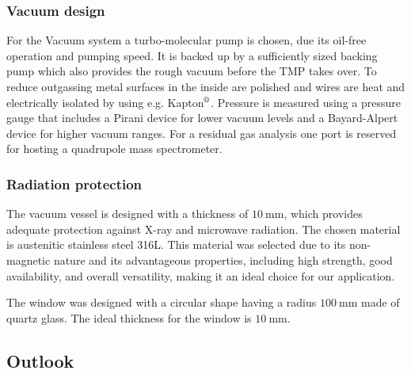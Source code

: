 \subsubsection{Vacuum design}


For the Vacuum system a turbo-molecular pump is chosen, due its oil-free operation and pumping speed.
It is backed up by a sufficiently sized backing pump which also provides the rough vacuum before the TMP takes over.
To reduce outgassing metal surfaces in the inside are polished and wires are heat and electrically isolated by using e.g. Kapton$\textsuperscript{\textregistered}$.
Pressure is measured using a pressure gauge that includes a Pirani device for lower vacuum levels and a Bayard-Alpert device for higher vacuum ranges.
For a residual gas analysis one port is reserved for hosting a quadrupole mass spectrometer.


\subsubsection{Radiation protection}

The vacuum vessel is designed with a thickness of $\SI{10}{\milli\meter}$, which provides adequate protection against X-ray and microwave radiation. The chosen material is austenitic stainless steel 316L. This material was selected due to its non-magnetic nature and its advantageous properties, including high strength, good availability, and overall versatility, making it an ideal choice for our application.

The window was designed with a circular shape having a radius $\SI{100}{\milli\meter}$ made of quartz glass. The ideal thickness for the window is $\SI{10}{\milli\meter}$.


\subsection{Outlook}

